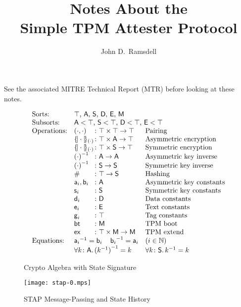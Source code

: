 \documentclass[12pt]{article}
\title{Notes About the \\ Simple TPM Attester Protocol}
\author{John D.\ Ramsdell}
\newcommand{\cn}[1]{\ensuremath{\operatorname{\mathsf{#1}}}}
\newcommand{\enc}[2]{\ensuremath{\{\!|#1|\!\}_{#2}}}
\newcommand{\inv}[1]{{#1}^{-1}}
\newcommand{\srt}[1]{\ensuremath{\mathsf{#1}}}
\newcommand{\nat}{\ensuremath{\mathbb{N}}}
\newcommand{\all}[1]{\forall#1\mathpunct.}
\newcommand{\boot}{\cn{bt}}
\begin{document}
\maketitle

See the associated MITRE Technical Report (MTR) before looking at
these notes.

\begin{figure}
$$\begin{array}{ll@{{}\colon{}}ll}
\mbox{Sorts:}&
\multicolumn{3}{l}{\mbox{$\top$, $\srt{A}$, $\srt{S}$, $\srt{D}$,
 $\srt{E}$, \srt{M}}}\\
\mbox{Subsorts:}&
\multicolumn{3}{l}{\mbox{$\srt{A}<\top$, $\srt{S}<\top$,
    $\srt{D}<\top$, $\srt{E}<\top$}}\\
\mbox{Operations:}&(\cdot,\cdot)&\top\times\top\to\top& \mbox{Pairing}\\
&\enc{\cdot}{(\cdot)}&\top\times\srt{A}\to\top&\mbox{Asymmetric encryption}\\
&\enc{\cdot}{(\cdot)}&\top\times\srt{S}\to\top&\mbox{Symmetric encryption}\\
&\inv{(\cdot)}&\srt{A}\to\srt{A}& \mbox{Asymmetric key inverse}\\
&\inv{(\cdot)}&\srt{S}\to\srt{S}& \mbox{Symmetric key inverse}\\
&\#&\srt{\top}\to\srt{S}& \mbox{Hashing}\\
&\cn{a}_i,\cn{b}_i&\srt{A}& \mbox{Asymmetric key constants}\\
&\cn{s}_i&\srt{S}& \mbox{Symmetric key constants}\\
&\cn{d}_i&\srt{D}& \mbox{Data constants}\\
&\cn{e}_i&\srt{E}& \mbox{Text constants}\\
&\cn{g}_i&\top& \mbox{Tag constants}\\
&\boot&\srt{M}&\mbox{TPM boot}\\
&\cn{ex}&\top\times\srt{M}\to\srt{M}&\mbox{TPM extend}\\
\mbox{Equations:}&\multicolumn{2}{l}{\inv{\cn{a}_i}=\cn{b}_i\quad
\inv{\cn{b}_i}=\cn{a}_i}
&(i\in\nat)\\
&\multicolumn{2}{l}{\all{k\colon\srt{A}}\inv{(\inv{k})}=k}
&\all{k\colon\srt{S}}\inv{k}=k
\end{array}$$
\caption{Crypto Algebra with State Signature}\label{fig:signature}
\end{figure}

\begin{figure}
  \begin{center}
    \texttt{[image: stap-0.mps]}
  \end{center}
  \caption{STAP Message-Passing and State History}\label{fig:shape}
\end{figure}
\end{document}
